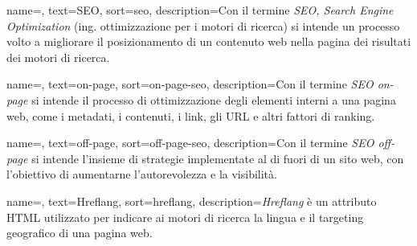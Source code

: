 







 {
    name=,
    text=SEO,
    sort=seo,
    description={Con il termine \emph{SEO, Search Engine Optimization} (ing. ottimizzazione per i motori di ricerca) si intende un processo volto a migliorare il posizionamento di un contenuto web nella pagina dei risultati dei motori di ricerca.}
}

 {
    name=,
    text=on-page,
    sort=on-page-seo,
    description={Con il termine \emph{SEO on-page} si intende il processo di ottimizzazione degli elementi interni a una pagina web, come i metadati, i contenuti, i link, gli URL e altri fattori di ranking.}
}

 {
    name=,
    text=off-page,
    sort=off-page-seo,
    description={Con il termine \emph{SEO off-page} si intende l'insieme di strategie implementate al di fuori di un sito web, con l'obiettivo di aumentarne l'autorevolezza e la visibilità.}
}

 {
    name=,
    text=Hreflang,
    sort=hreflang,
    description={\emph{Hreflang} è un attributo HTML utilizzato per indicare ai motori di ricerca la lingua e il targeting geografico di una pagina web.}
}

